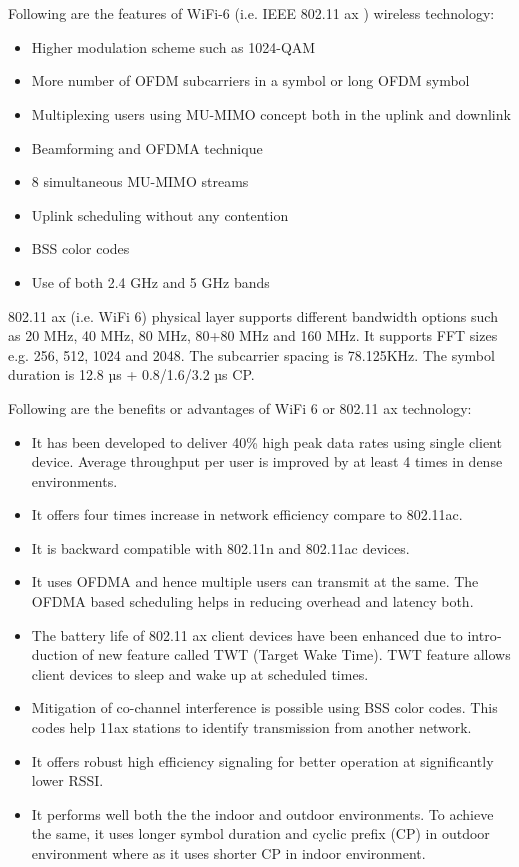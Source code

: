 \documentclass{article}
\begin{document}
\section{}
\begin{latin}
Following are the features of WiFi-6 (i.e. IEEE 802.11 ax ) wireless technology:
\begin{itemize}
\item Higher modulation scheme such as 1024-QAM
\item More number of OFDM subcarriers in a symbol or long OFDM symbol
\item Multiplexing users using MU-MIMO concept both in the uplink and downlink
\item Beamforming and OFDMA technique
\item 8 simultaneous MU-MIMO streams
\item Uplink scheduling without any contention
\item BSS color codes
\item Use of both 2.4 GHz and 5 GHz bands
\end{itemize}

802.11 ax (i.e. WiFi 6) physical layer supports different bandwidth options such as 20 MHz, 40 MHz, 80 MHz, 80+80 MHz and 160 MHz. It supports FFT sizes e.g. 256, 512, 1024 and 2048. The subcarrier spacing is 78.125KHz. The symbol duration is 12.8 µs + 0.8/1.6/3.2 µs CP.

Following are the benefits or advantages of WiFi 6 or 802.11 ax technology:
\begin{itemize}
\item It has been developed to deliver 40\% high peak data rates using single client device. Average throughput per user is improved by at least 4 times in dense environments.
\item It offers four times increase in network efficiency compare to 802.11ac.
\item It is backward compatible with 802.11n and 802.11ac devices.
\item It uses OFDMA and hence multiple users can transmit at the same. The OFDMA based scheduling helps in reducing overhead and latency both.
\item The battery life of 802.11 ax client devices have been enhanced due to introduction of new feature called TWT (Target Wake Time). TWT feature allows client devices to sleep and wake up at scheduled times.
\item Mitigation of co-channel interference is possible using BSS color codes. This codes help 11ax stations to identify transmission from another network.
\item It offers robust high efficiency signaling for better operation at significantly lower RSSI.
\item It performs well both the the indoor and outdoor environments. To achieve the same, it uses longer symbol duration and cyclic prefix (CP) in outdoor environment where as it uses shorter CP in indoor environment. 
\end{itemize}
\end{latin}
\end{document}
